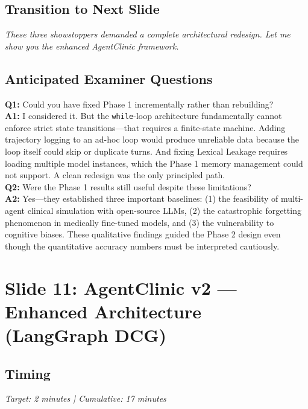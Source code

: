 \documentclass[12pt]{article}
\begin{document}
  \subsection*{Transition to Next Slide}
  {\color{transgreen}
  \textit{These three showstoppers demanded a complete architectural redesign. Let me show you the enhanced AgentClinic framework.}
  }

  \subsection*{Anticipated Examiner Questions}
  \begin{qabox}
  \textbf{Q1:} Could you have fixed Phase 1 incrementally rather than rebuilding? \\
  \textbf{A1:} I considered it. But the \texttt{while}-loop architecture fundamentally cannot enforce strict state transitions---that requires a finite-state machine. Adding trajectory logging to an ad-hoc loop would produce unreliable data because the loop itself could skip or duplicate turns. And fixing Lexical Leakage requires loading multiple model instances, which the Phase 1 memory management could not support. A clean redesign was the only principled path. \\[6pt]
  \textbf{Q2:} Were the Phase 1 results still useful despite these limitations? \\
  \textbf{A2:} Yes---they established three important baselines: (1) the feasibility of multi-agent clinical simulation with open-source LLMs, (2) the catastrophic forgetting phenomenon in medically fine-tuned models, and (3) the vulnerability to cognitive biases. These qualitative findings guided the Phase 2 design even though the quantitative accuracy numbers must be interpreted cautiously.
  \end{qabox}



  \section{Slide 11: AgentClinic v2 --- Enhanced Architecture (LangGraph DCG)}

  \subsection*{Timing}
  \textit{Target: 2 minutes | Cumulative: 17 minutes}
\end{document}
